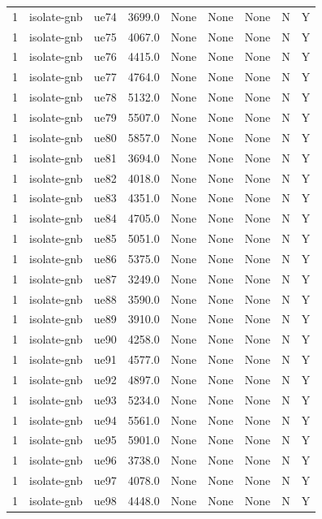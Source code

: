 \begin{table}[ht]
\begin{tabular}{|c|c|c|c|c|c|c|c|c|}
1 & isolate-gnb & ue74 & 3699.0 & None & None & None & N & Y \\
1 & isolate-gnb & ue75 & 4067.0 & None & None & None & N & Y \\
1 & isolate-gnb & ue76 & 4415.0 & None & None & None & N & Y \\
1 & isolate-gnb & ue77 & 4764.0 & None & None & None & N & Y \\
1 & isolate-gnb & ue78 & 5132.0 & None & None & None & N & Y \\
1 & isolate-gnb & ue79 & 5507.0 & None & None & None & N & Y \\
1 & isolate-gnb & ue80 & 5857.0 & None & None & None & N & Y \\
1 & isolate-gnb & ue81 & 3694.0 & None & None & None & N & Y \\
1 & isolate-gnb & ue82 & 4018.0 & None & None & None & N & Y \\
1 & isolate-gnb & ue83 & 4351.0 & None & None & None & N & Y \\
1 & isolate-gnb & ue84 & 4705.0 & None & None & None & N & Y \\
1 & isolate-gnb & ue85 & 5051.0 & None & None & None & N & Y \\
1 & isolate-gnb & ue86 & 5375.0 & None & None & None & N & Y \\
1 & isolate-gnb & ue87 & 3249.0 & None & None & None & N & Y \\
1 & isolate-gnb & ue88 & 3590.0 & None & None & None & N & Y \\
1 & isolate-gnb & ue89 & 3910.0 & None & None & None & N & Y \\
1 & isolate-gnb & ue90 & 4258.0 & None & None & None & N & Y \\
1 & isolate-gnb & ue91 & 4577.0 & None & None & None & N & Y \\
1 & isolate-gnb & ue92 & 4897.0 & None & None & None & N & Y \\
1 & isolate-gnb & ue93 & 5234.0 & None & None & None & N & Y \\
1 & isolate-gnb & ue94 & 5561.0 & None & None & None & N & Y \\
1 & isolate-gnb & ue95 & 5901.0 & None & None & None & N & Y \\
1 & isolate-gnb & ue96 & 3738.0 & None & None & None & N & Y \\
1 & isolate-gnb & ue97 & 4078.0 & None & None & None & N & Y \\
1 & isolate-gnb & ue98 & 4448.0 & None & None & None & N & Y \\

\end{tabular}
\end{table}
